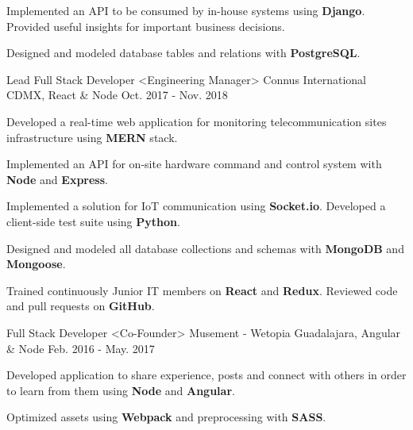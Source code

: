 \begin{cventries}
{\begin{cvitems}
        \item {Implemented an API to be consumed by  in-house systems using \textbf{Django}. Provided useful insights for important business decisions.}
        \item {Designed and modeled database tables and relations with \textbf{PostgreSQL}.}
      \end{cvitems}
    }
  \cventry
    {Lead Full Stack Developer <Engineering Manager>}
    {Connus International}
    {CDMX, React \& Node}
    {Oct. 2017 - Nov. 2018}
    {
      \begin{cvitems}
        \item {Developed a real-time web application for monitoring telecommunication sites infrastructure using \textbf{MERN} stack.}
        \item {Implemented an API for on-site hardware command and control system with \textbf{Node} and \textbf{Express}.}
        \item {Implemented a solution for IoT communication using \textbf{Socket.io}. Developed a client-side test suite using \textbf{Python}.}
        \item {Designed and modeled all database collections and schemas with \textbf{MongoDB} and \textbf{Mongoose}.}
        \item {Trained continuously Junior IT members on \textbf{React} and \textbf{Redux}. Reviewed code and pull requests on \textbf{GitHub}.}
      \end{cvitems}
    }
    \cventry
      {Full Stack Developer <Co-Founder>}
      {Musement - Wetopia}
      {Guadalajara, Angular \& Node}
      {Feb. 2016 - May. 2017}
      {
        \begin{cvitems}
          \item {Developed application to share experience, posts and connect with others in order to learn from them using \textbf{Node} and \textbf{Angular}.}
          \item {Optimized assets using \textbf{Webpack} and preprocessing with \textbf{SASS}.}
        \end{cvitems}
      }
  \end{cventries}
